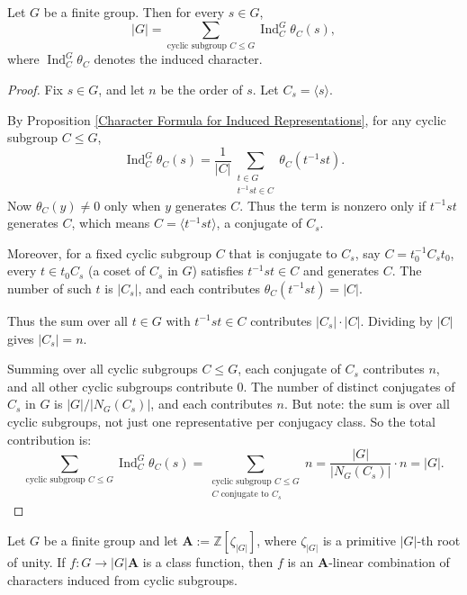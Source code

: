 \begin{lemma}\label{Decomposition of the Constant Function}
Let \(G\) be a finite group. Then for every \(s \in G\),
\[
|G| = \sum_{\text{cyclic subgroup }C \le G} \operatorname{Ind}_C^G \theta_C(s),
\]
where \(\operatorname{Ind}_C^G \theta_C\) denotes the induced character.
\end{lemma}
\begin{proof}
Fix \(s \in G\), and let \(n\) be the order of \(s\). Let \(C_s = \langle s \rangle\).

By Proposition \ref{Character Formula for Induced Representations}, for any cyclic subgroup \(C \le G\),
\[
\operatorname{Ind}_C^G \theta_C(s)
= \frac{1}{|C|} \sum_{\substack{t \in G \\ t^{-1} s t \in C}} \theta_C(t^{-1} s t).
\]
Now \(\theta_C(y) \neq 0\) only when \(y\) generates \(C\). Thus the term is nonzero only if \(t^{-1} s t\) generates \(C\), which means \(C = \langle t^{-1} s t \rangle\), a conjugate of \(C_s\).

Moreover, for a fixed cyclic subgroup \(C\) that is conjugate to \(C_s\), say \(C = t_0^{-1} C_s t_0\), every \(t \in t_0 C_s\) (a coset of \(C_s\) in \(G\)) satisfies \(t^{-1} s t \in C\) and generates \(C\). The number of such \(t\) is \(|C_s|\), and each contributes \(\theta_C(t^{-1} s t) = |C|\).

Thus the sum over all \(t \in G\) with \(t^{-1} s t \in C\) contributes \(|C_s| \cdot |C|\). Dividing by \(|C|\) gives \(|C_s| = n\).

Summing over all cyclic subgroups \(C \le G\), each conjugate of \(C_s\) contributes \(n\), and all other cyclic subgroups contribute \(0\). The number of distinct conjugates of \(C_s\) in \(G\) is \(|G|/|N_G(C_s)|\), and each contributes \(n\). But note: the sum is over all cyclic subgroups, not just one representative per conjugacy class. So the total contribution is:
\[
\sum_{\text{cyclic subgroup }C \le G} \operatorname{Ind}_C^G \theta_C(s)
= \sum_{\substack{\text{cyclic subgroup }C \le G \\ C \text{ conjugate to } C_s}} n
= \frac{|G|}{|N_G(C_s)|} \cdot n
= |G|.
\]
\end{proof}
\begin{lemma}
\label{Class Functions to linear combination}
Let $G$ be a finite group and let \(\mathbf{A} := \mathbb{Z}[\zeta_{|G|}]\), where \(\zeta_{|G|}\) is a primitive \(|G|\)-th root of unity. If \(f: G \to |G|\mathbf{A}\) is a class function, then \(f\) is an \(\mathbf{A}\)-linear combination of characters induced from cyclic subgroups.
\end{lemma}

